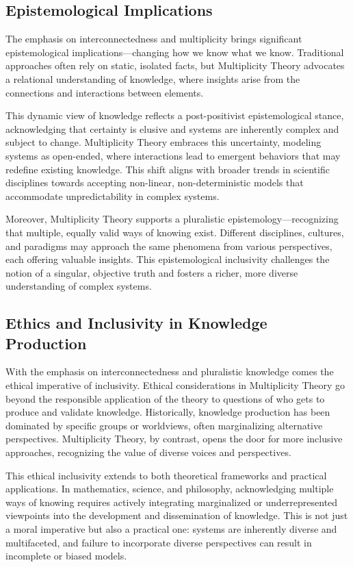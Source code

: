 \documentclass[12pt]{article}
\begin{document}
\subsection{Epistemological Implications}

The emphasis on interconnectedness and multiplicity brings significant epistemological implications—changing how we know what we know. Traditional approaches often rely on static, isolated facts, but Multiplicity Theory advocates a relational understanding of knowledge, where insights arise from the connections and interactions between elements.

This dynamic view of knowledge reflects a post-positivist epistemological stance, acknowledging that certainty is elusive and systems are inherently complex and subject to change. Multiplicity Theory embraces this uncertainty, modeling systems as open-ended, where interactions lead to emergent behaviors that may redefine existing knowledge. This shift aligns with broader trends in scientific disciplines towards accepting non-linear, non-deterministic models that accommodate unpredictability in complex systems.

Moreover, Multiplicity Theory supports a pluralistic epistemology—recognizing that multiple, equally valid ways of knowing exist. Different disciplines, cultures, and paradigms may approach the same phenomena from various perspectives, each offering valuable insights. This epistemological inclusivity challenges the notion of a singular, objective truth and fosters a richer, more diverse understanding of complex systems.

\subsection{Ethics and Inclusivity in Knowledge Production}

With the emphasis on interconnectedness and pluralistic knowledge comes the ethical imperative of inclusivity. Ethical considerations in Multiplicity Theory go beyond the responsible application of the theory to questions of who gets to produce and validate knowledge. Historically, knowledge production has been dominated by specific groups or worldviews, often marginalizing alternative perspectives. Multiplicity Theory, by contrast, opens the door for more inclusive approaches, recognizing the value of diverse voices and perspectives.

This ethical inclusivity extends to both theoretical frameworks and practical applications. In mathematics, science, and philosophy, acknowledging multiple ways of knowing requires actively integrating marginalized or underrepresented viewpoints into the development and dissemination of knowledge. This is not just a moral imperative but also a practical one: systems are inherently diverse and multifaceted, and failure to incorporate diverse perspectives can result in incomplete or biased models.
\end{document}
